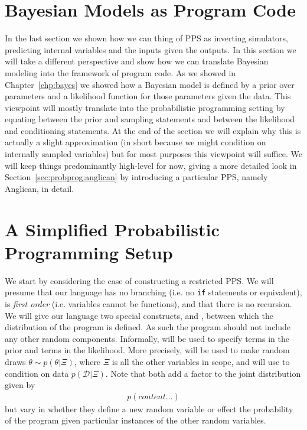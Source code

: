 
\section{Bayesian Models as Program Code}
\label{sec:probprog:models}

In the last section we shown how we can thing of PPS as inverting simulators, predicting internal
variables and the inputs given the outputs.  In this section we will take a different perspective and
show how we can translate Bayesian modeling into the framework of program code.  As we 
showed in Chapter~\ref{chp:bayes} we showed how a Bayesian model is defined by a prior over
parameters and a likelihood function for those parameters given the data.  This viewpoint will
mostly translate into the probabilistic programming setting by equating between the prior
and sampling statements and between the likelihood and conditioning statements.  At the end
of the section we will explain why this is actually a slight approximation (in short because we
might condition on internally sampled variables) but for most purposes this viewpoint will suffice.
We will keep things predominantly high-level for now, giving a more detailed look in
Section~\ref{sec:probprog:anglican} by introducing a particular PPS, namely Anglican, in detail.

\section{A Simplified Probabilistic Programming Setup}
\label{sec:probprog:models:first}

We start by considering the case of constructing a restricted PPS.  We will presume that our
language has no branching (i.e. no \texttt{if} statements or equivalent), is \emph{first order}
(i.e. variables cannot be functions), and that there is no recursion.  We will give our language
two special constructs, \sample and \observe, between which the distribution of the
program is defined.  As such the program should not include any other random components.
Informally, \sample will be used to specify terms in the prior and \observe terms in the
likelihood.  More precisely, \sample will be used to make random draws $\theta \sim p(\theta | \Xi)$,
where $\Xi$ is all the other variables in scope, and \observe will use to condition on
data $p(\mathcal{D}|\Xi)$.  Note that both add a factor to the joint distribution given by
\begin{align}
p(content...)
\end{align}
but vary in whether they define a new random variable or effect the probability of the
program given particular instances of the other random variables.





